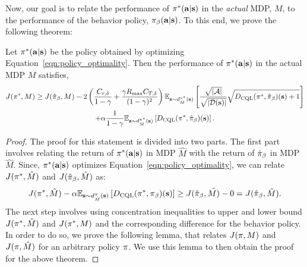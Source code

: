 Now, our goal is to relate the performance of $\pi^*(\mathbf{a}|\mathbf{s})$ in the \emph{actual} MDP, $M$, to the performance of the behavior policy, ${\pi_\beta}(\mathbf{a}|\mathbf{s})$. To this end, we prove the following theorem:
\begin{theorem}
\label{thm:zeta_safe_app}
Let $\pi^*(\mathbf{a}|\mathbf{s})$ be the policy obtained by optimizing Equation~\ref{eqn:policy_optimality}. Then the performance of $\pi^*(\mathbf{a}|\mathbf{s})$ in the actual MDP $M$ satisfies,
\begin{multline}
    \label{eqn:performance_relation}
    J(\pi^*, M) \geq J(\hat{\pi}_\beta, M) - 2\left({\frac{C_{r, \delta}}{1 - \gamma} + \frac{\gamma R_{\max} C_{T, \delta}}{(1 - \gamma)^2}} \right)\mathbb{E}_{\mathbf{s} \sim d^{\pi^*}_{\hat{M}}(\mathbf{s})}\left[ \frac{\sqrt{|\mathcal{A}|}}{\sqrt{|\mathcal{D}(\mathbf{s})|}} \sqrt{ D_{\text{CQL}}(\pi^*, \hat{\pi}_\beta)(\mathbf{s}) + 1} \right] \\
    + \alpha \frac{1}{1 - \gamma} \mathbb{E}_{\mathbf{s} \sim d^{\pi^*}_{\hat{M}}(\mathbf{s})}\left[D_{\text{CQL}}(\pi^*, \hat{\pi}_\beta)(\mathbf{s}) \right].
\end{multline}
\end{theorem}
\begin{proof}
The proof for this statement is divided into two parts. The first part involves relating the return of $\pi^*(\mathbf{a}|\mathbf{s})$ in MDP $\hat{M}$ with the return of $\hat{\pi}_\beta$ in MDP $\hat{M}$. Since, $\pi^*(\mathbf{a}|\mathbf{s})$ optimizes Equation~\ref{eqn:policy_optimality}, we can relate $J(\pi^*, \hat{M})$ and $J(\hat{\pi}_\beta, \hat{M})$ as:
\begin{equation*}
    J(\pi^*, \hat{M}) - \alpha \mathbb{E}_{\mathbf{s} \sim d^\pi_{\hat{M}}(\mathbf{s})}\left[D_{\text{CQL}}(\pi^*, {\pi_\beta})(\mathbf{s}) \right] \geq J(\hat{\pi}_\beta, \hat{M)} - 0 = J(\hat{\pi}_\beta, \hat{M}).
\end{equation*}
The next step involves using concentration inequalities to upper and lower bound $J(\pi^*, \hat{M})$ and $J(\pi^*, M)$ and the corresponding difference for the behavior policy. In order to do so, we prove the following lemma, that relates $J(\pi, M)$ and $J(\pi, \hat{M})$ for an arbitrary policy $\pi$. We use this lemma to then obtain the proof for the above theorem.
\end{proof}

